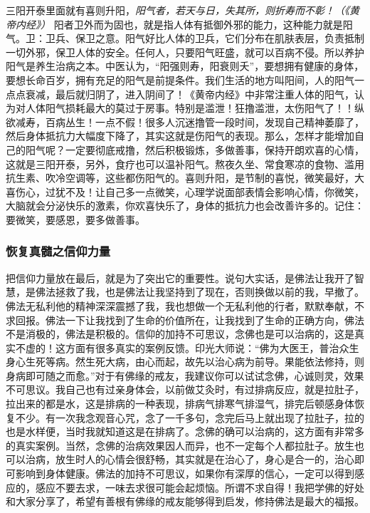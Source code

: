 三阳开泰里面就有喜则升阳，\textit{阳气者，若天与日，失其所，则折寿而不彰！（《黄帝内经》）} 阳者卫外而为固也，就是指人体有抵御外邪的能力，这种能力就是阳气。卫：卫兵、保卫之意。阳气好比人体的卫兵，它们分布在肌肤表层，负责抵制一切外邪，保卫人体的安全。任何人，只要阳气旺盛，就可以百病不侵。所以养护阳气是养生治病之本。中医认为，“阳强则寿，阳衰则夭”，要想拥有健康的身体，要想长命百岁，拥有充足的阳气是前提条件。我们生活的地方叫阳间，人的阳气一点点衰减，最后就归阴了，进入阴间了！《黄帝内经》中非常注重人体的阳气，认为对人体阳气损耗最大的莫过于房事。特别是滥泄！狂撸滥泄，太伤阳气了！！纵欲减寿，百病丛生！一点不假！很多人沉迷撸管一段时间，发现自己精神萎靡了，然后身体抵抗力大幅度下降了，其实这就是伤阳气的表现。那么，怎样才能增加自己的阳气呢？一定要彻底戒撸，然后积极锻炼，多做善事，保持开朗欢喜的心情，这就是三阳开泰，另外，食疗也可以温补阳气。熬夜久坐、常食寒凉的食物、滥用抗生素、吹冷空调等，这些都伤阳气的。喜则升阳，是节制的喜悦，微笑最好，大喜伤心，过犹不及！让自己多一点微笑，心理学说面部表情会影响心情，你微笑，大脑就会分泌快乐的激素，你欢喜快乐了，身体的抵抗力也会改善许多的。记住：要微笑，要感恩，要多做善事。

\subsubsection{恢复真髓之信仰力量}

把信仰力量放在最后，就是为了突出它的重要性。说句大实话，是佛法让我开了智慧，是佛法拯救了我，也是佛法让我坚持到了现在，否则换做以前的我，早撤了。佛法无私利他的精神深深震撼了我，我也想做一个无私利他的行者，默默奉献，不求回报。佛法一下让我找到了生命的价值所在，让我找到了生命的正确方向，佛法不是消极的，佛法是积极的。信仰的加持不可思议，念佛也是可以治病的，这是真实不虚的！这方面有很多真实的案例反馈。印光大师说：“佛为大医王，普治众生身心生死等病。然生死大病，由心而起，故先以治心病为前导。果能依法修持，则身病即可随之而愈。”对于有佛缘的戒友，我建议你可以试试念佛，心诚则灵，效果不可思议。我自己也有过亲身体会，以前做艾灸时，有过排病反应，就是拉肚子，拉出来的都是水，这是排病的一种表现，排病气排寒气排湿气，排完后顿感身体恢复不少。有一次我念观音心咒，念了一千多句，念完后马上就出现了拉肚子，拉的也是水样便，当时我就知道这是在排病了。念佛的确可以治病的，这方面有非常多的真实案例。当然，念佛的治病效果因人而异，也不一定每个人都拉肚子。放生也可以治病，放生时人的心情会很舒畅，其实就是在治心了，身心是合一的，治心即可影响到身体健康。佛法的加持不可思议，如果你有深厚的信心，一定可以得到感应的，感应不要去求，一味去求很可能会起烦恼。所谓不求自得！我把学佛的好处和大家分享了，希望有善根有佛缘的戒友能够得到启发，修持佛法是最大的福报。

